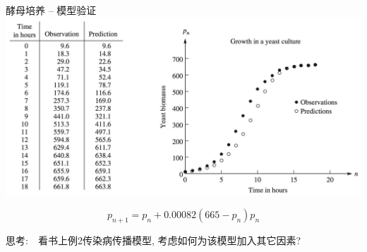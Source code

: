 \documentclass[
  ignorenonframetext,
]{ctexbeamer}
\begin{document}
\begin{frame}{酵母培养 -- 模型验证}
\label{ux9175ux6bcdux57f9ux517b-ux6a21ux578bux9a8cux8bc1}
\includegraphics{yeast-verify.png}

\[p_{n+1} = p_n + 0.00082(665 - p_n)p_n\]

思考:　看书上例2传染病传播模型, 考虑如何为该模型加入其它因素?
\end{frame}
\end{document}
